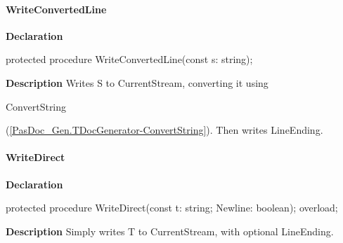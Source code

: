 \documentclass{report}
\newif\ifpdf
\begin{document}
\paragraph*{WriteConvertedLine}\hspace*{\fill}

\label{PasDoc_Gen.TDocGenerator-WriteConvertedLine}
\begin{list}{}{
\setlength{\itemindent}{0cm}
\setlength{\listparindent}{0cm}
\setlength{\leftmargin}{\evensidemargin}
\addtolength{\leftmargin}{\tmplength}
\settowidth{\labelsep}{X}
\addtolength{\leftmargin}{\labelsep}
\setlength{\labelwidth}{\tmplength}
}
\item[\textbf{Declaration}\hfill]
\ifpdf
\begin{flushleft}
\fi
\begin{ttfamily}
protected procedure WriteConvertedLine(const s: string);\end{ttfamily}

\ifpdf
\end{flushleft}
\fi

\par
\item[\textbf{Description}]
Writes S to CurrentStream, converting it using \begin{ttfamily}ConvertString\end{ttfamily}(\ref{PasDoc_Gen.TDocGenerator-ConvertString}). Then writes LineEnding.

\end{list}
\paragraph*{WriteDirect}\hspace*{\fill}

\label{PasDoc_Gen.TDocGenerator-WriteDirect}
\begin{list}{}{
\setlength{\itemindent}{0cm}
\setlength{\listparindent}{0cm}
\setlength{\leftmargin}{\evensidemargin}
\addtolength{\leftmargin}{\tmplength}
\settowidth{\labelsep}{X}
\addtolength{\leftmargin}{\labelsep}
\setlength{\labelwidth}{\tmplength}
}
\item[\textbf{Declaration}\hfill]
\ifpdf
\begin{flushleft}
\fi
\begin{ttfamily}
protected procedure WriteDirect(const t: string; Newline: boolean); overload;\end{ttfamily}

\ifpdf
\end{flushleft}
\fi

\par
\item[\textbf{Description}]
Simply writes T to CurrentStream, with optional LineEnding.

\end{list}
\end{document}
